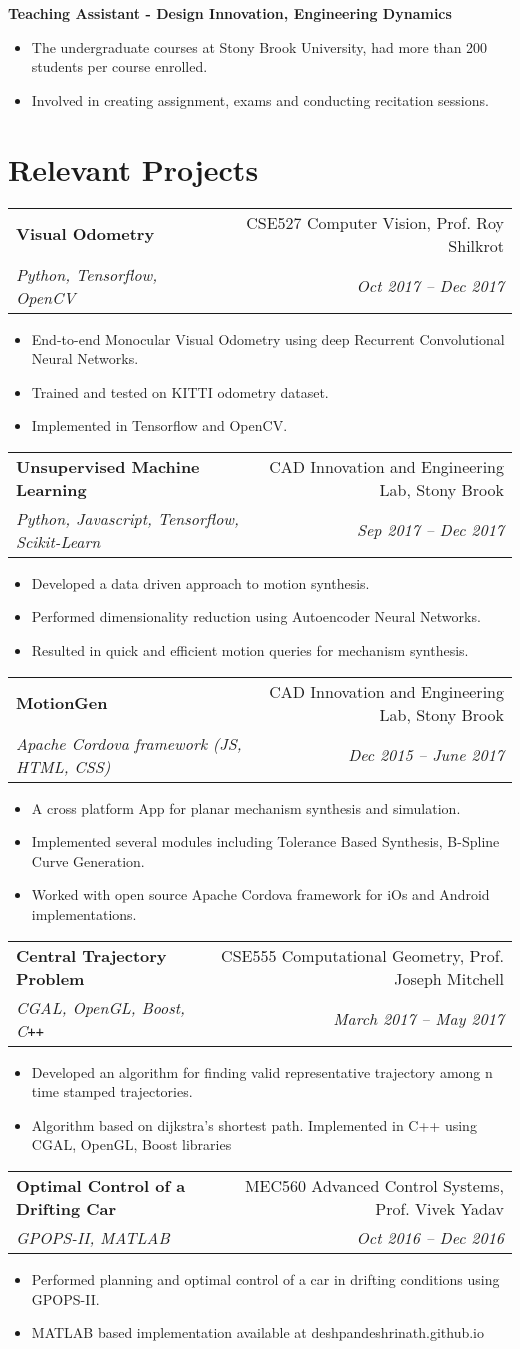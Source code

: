 \documentclass[letterpaper,10pt]{article}
\makeatletter
\newcommand{\resumeHeading}[4]{
  \vspace{-1pt}
    \begin{tabular*}{0.97\textwidth}{l@{\extracolsep{\fill}}r}
      \textbf{#1} & #2 \\ %
      \textit{\small#3} & \textit{\small #4} \\
    \end{tabular*}
}
\newcommand{\resumeSubheading}[1]{
      {\small\textbf{#1}} \\
}
\newcommand{\resumeSection}[1]{
\vspace{-12pt}
\section{#1}
}
\newcommand{\resumeItemListStart}{
\vspace{-7pt}
\begin{itemize}[leftmargin=14pt]
}
\newcommand{\resumeItemListEnd}{
\vspace{+7pt}
\end{itemize}
}
\newcommand{\resumeItem}[1]{
  \item\small{
      {#1 \vspace{-7pt}
      }
  }
}
\makeatother
\begin{document}
      \vspace{-5pt}
      \resumeSubheading{Teaching Assistant - Design Innovation, Engineering Dynamics}
      \resumeItemListStart
        \resumeItem{The undergraduate courses at Stony Brook University, had more than 200 students per course enrolled.}
        \resumeItem{Involved in creating assignment, exams and conducting recitation sessions.}
      \resumeItemListEnd
\resumeSection{Relevant Projects}
    \resumeHeading{Visual Odometry}{CSE527 Computer Vision, Prof. Roy Shilkrot} {Python, Tensorflow, OpenCV}{Oct 2017 -- Dec 2017}
    \resumeItemListStart
      \resumeItem{End-to-end Monocular Visual Odometry using deep Recurrent Convolutional Neural Networks.}
      \resumeItem{Trained and tested on KITTI odometry dataset.}
      \resumeItem{Implemented in Tensorflow and OpenCV.}
    \resumeItemListEnd

    \resumeHeading{Unsupervised Machine Learning}{CAD Innovation and Engineering Lab, Stony Brook}{Python, Javascript, Tensorflow, Scikit-Learn} {Sep 2017 -- Dec 2017}
    \resumeItemListStart
      \resumeItem{Developed a data driven approach to motion synthesis.}
      \resumeItem{Performed dimensionality reduction using Autoencoder Neural Networks.}
      \resumeItem{Resulted in quick and efficient motion queries for mechanism synthesis.}
    \resumeItemListEnd

    \resumeHeading{MotionGen}{CAD Innovation and Engineering Lab, Stony Brook}{Apache Cordova framework (JS, HTML, CSS)}{Dec 2015 -- June 2017}
    \resumeItemListStart
      \resumeItem{A cross platform App for planar mechanism synthesis and simulation.}
      \resumeItem{Implemented several modules including Tolerance Based Synthesis, B-Spline Curve Generation.}
      \resumeItem{Worked with open source Apache Cordova framework for iOs and Android implementations.}
    \resumeItemListEnd

    \resumeHeading{Central Trajectory Problem}{CSE555 Computational Geometry, Prof. Joseph Mitchell}{CGAL, OpenGL, Boost, C\texttt{++}}{March 2017 -- May 2017}
    \resumeItemListStart
      \resumeItem{Developed an algorithm for finding valid representative trajectory among n time stamped trajectories.}
      \resumeItem{Algorithm based on dijkstra's shortest path. Implemented in C++ using CGAL, OpenGL, Boost libraries}
    \resumeItemListEnd

    \resumeHeading{Optimal Control of a Drifting Car}{MEC560 Advanced Control Systems, Prof. Vivek Yadav}{GPOPS-II, MATLAB}{Oct 2016 -- Dec 2016}
    \resumeItemListStart
      \resumeItem{Performed planning and optimal control of a car in drifting conditions using GPOPS-II.}
      \resumeItem{MATLAB based implementation available at deshpandeshrinath.github.io}
    \resumeItemListEnd
\end{document}

